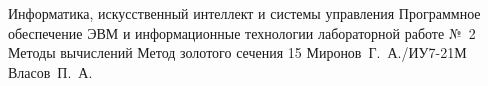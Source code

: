 \documentclass{bmstu}
\begin{document}
\makereporttitle
    {Информатика, искусственный интеллект и системы управления}
    {Программное обеспечение ЭВМ и информационные технологии}
    {лабораторной работе №~2}
    {Методы вычислений}
    {Метод золотого сечения}
    {15}
    {Миронов~Г.~А./ИУ7-21М}
    {Власов~П.~А.}


\end{document}

